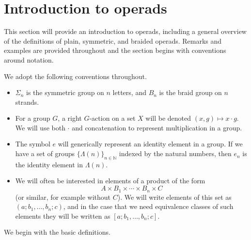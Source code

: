 \documentclass{amsbook} %
\newcommand{\N}{\mathbb{N}}
\numberwithin{section}{chapter}
\begin{document}
\section{Introduction to operads}
This section will provide an introduction to operads, including a general overview of the definitions of plain, symmetric, and braided operads. Remarks and examples are provided throughout and the section begins with conventions around notation.

\begin{conv}
We adopt the following conventions throughout.
\begin{itemize}
\item $\Sigma_{n}$ is the symmetric group on $n$ letters, and $B_{n}$ is the braid group on $n$ strands.
\item For a group $G$, a right $G$-action on a set $X$ will be denoted $(x,g) \mapsto x \cdot g$.  We will use both $\cdot$ and concatenation to represent multiplication in a group.
\item The symbol $e$ will generically represent an identity element in a group.  If we have a set of groups $\{ \Lambda(n) \}_{n \in \N}$ indexed by the natural numbers, then $e_{n}$ is the identity element in $\Lambda(n)$.
\item We will often be interested in elements of a product of the form
\[
A \times B_{1} \times \cdots \times B_{n} \times C
\]
(or similar, for example without $C$).  We will write elements of this set as $(a; b_{1}, \ldots, b_{n}; c)$, and in the case that we need equivalence classes of such elements they will be written as $[a; b_{1}, \ldots, b_{n}; c]$.
\end{itemize}
\end{conv}

We begin with the basic definitions.
\end{document}
